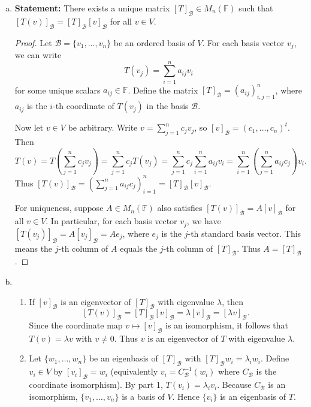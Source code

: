 \documentclass{article}
\begin{document}
\begin{enumerate}[(a)]
    \item \textbf{Statement:} There exists a unique matrix $[T]_{\mathscr{B}} \in M_{n}(\mathbb{F})$ such that $[T(v)]_{\mathscr{B}} = [T]_{\mathscr{B}} [v]_{\mathscr{B}}$ for all $v \in V$.

    \begin{proof} Let $\mathscr{B} = \{v_1, \ldots, v_n\}$ be an ordered basis of $V$. For each basis vector $v_j$, we can write
    \[
        T(v_j) = \sum_{i=1}^{n} a_{ij} v_i
    \]
    for some unique scalars $a_{ij} \in \mathbb{F}$. Define the matrix $[T]_{\mathscr{B}} = (a_{ij})_{i,j=1}^{n}$, where $a_{ij}$ is the $i$-th coordinate of $T(v_j)$ in the basis $\mathscr{B}$.

    Now let $v \in V$ be arbitrary. Write $v = \sum_{j=1}^{n} c_j v_j$, so $[v]_{\mathscr{B}} = (c_1, \ldots, c_n)^t$. Then
    \[
        T(v) = T\left(\sum_{j=1}^{n} c_j v_j\right) = \sum_{j=1}^{n} c_j T(v_j) = \sum_{j=1}^{n} c_j \sum_{i=1}^{n} a_{ij} v_i = \sum_{i=1}^{n} \left(\sum_{j=1}^{n} a_{ij} c_j\right) v_i.
    \]
    Thus $[T(v)]_{\mathscr{B}} = \left(\sum_{j=1}^{n} a_{ij} c_j\right)_{i=1}^{n} = [T]_{\mathscr{B}} [v]_{\mathscr{B}}$.

    For uniqueness, suppose $A \in M_n(\mathbb{F})$ also satisfies $[T(v)]_{\mathscr{B}} = A[v]_{\mathscr{B}}$ for all $v \in V$. In particular, for each basis vector $v_j$, we have $[T(v_j)]_{\mathscr{B}} = A[v_j]_{\mathscr{B}} = Ae_j$, where $e_j$ is the $j$-th standard basis vector. This means the $j$-th column of $A$ equals the $j$-th column of $[T]_{\mathscr{B}}$. Thus $A = [T]_{\mathscr{B}}$.
    \end{proof}
    \item 
    \begin{enumerate}[1.]
        \item If $[v]_{\mathscr{B}}$ is an eigenvector of $[T]_{\mathscr{B}}$ with eigenvalue $\lambda$, then
        \[
            [T(v)]_{\mathscr{B}} = [T]_{\mathscr{B}}[v]_{\mathscr{B}} = \lambda [v]_{\mathscr{B}} = [\lambda v]_{\mathscr{B}}.
        \]
        Since the coordinate map $v \mapsto [v]_{\mathscr{B}}$ is an isomorphism, it follows that $T(v) = \lambda v$ with $v \neq 0$. Thus $v$ is an eigenvector of $T$ with eigenvalue $\lambda$.
        \item Let $\{w_1,\dots,w_n\}$ be an eigenbasis of $[T]_{\mathscr{B}}$ with $[T]_{\mathscr{B}} w_i = \lambda_i w_i$. Define $v_i \in V$ by $[v_i]_{\mathscr{B}} = w_i$ (equivalently $v_i = C_{\mathscr{B}}^{-1}(w_i)$ where $C_{\mathscr{B}}$ is the coordinate isomorphism). By part 1, $T(v_i) = \lambda_i v_i$. Because $C_{\mathscr{B}}$ is an isomorphism, $\{v_1,\dots,v_n\}$ is a basis of $V$. Hence $\{v_i\}$ is an eigenbasis of $T$.
    \end{enumerate}


\end{enumerate}
\end{document}
